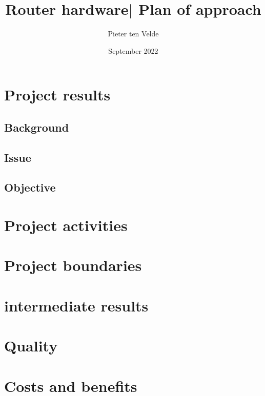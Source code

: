 \documentclass{article}
\title{Router hardware| Plan of approach}
\author{Pieter ten Velde}
\date{September 2022}
\begin{document}
\maketitle
\newpage
\tableofcontents
\newpage

\newpage
\section{Project results}
\subsection{Background}

\subsection{Issue}
\label{subsub:probleemstelling}


\subsection{Objective}


\newpage
\section{Project activities}



\newpage
\section{Project boundaries}



\newpage
\section{intermediate results}



\newpage
\section{Quality}



%


\section{Costs and benefits}




\end{document}
